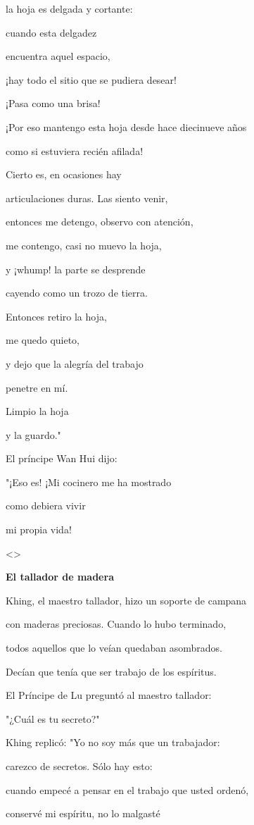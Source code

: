 la hoja es delgada y cortante:

cuando esta delgadez

encuentra aquel espacio,

¡hay todo el sitio que se pudiera desear!

¡Pasa como una brisa!

¡Por eso mantengo esta hoja desde hace diecinueve años

como si estuviera recién afilada!

Cierto es, en ocasiones hay

articulaciones duras. Las siento venir,

entonces me detengo, observo con atención,

me contengo, casi no muevo la hoja,

y ¡whump! la parte se desprende

cayendo como un trozo de tierra.

Entonces retiro la hoja,

me quedo quieto,

y dejo que la alegría del trabajo

penetre en mí.

Limpio la hoja

y la guardo."

El príncipe Wan Hui dijo:

"¡Eso es! ¡Mi cocinero me ha mostrado

como debiera vivir

mi propia vida!

\textless\textgreater{}

\textbf{{El tallador de madera}}

Khing, el maestro tallador, hizo un soporte de campana

con maderas preciosas. Cuando lo hubo terminado,

todos aquellos que lo veían quedaban asombrados.

Decían que tenía que ser trabajo de los espíritus.

El Príncipe de Lu preguntó al maestro tallador:

"¿Cuál es tu secreto?"

Khing replicó: "Yo no soy más que un trabajador:

carezco de secretos. Sólo hay esto:

cuando empecé a pensar en el trabajo que usted ordenó,

conservé mi espíritu, no lo malgasté

